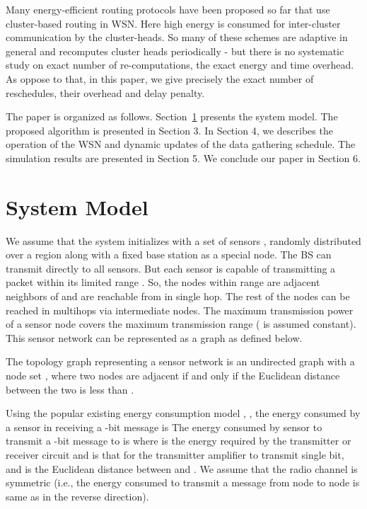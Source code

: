 \documentclass[10pt]{llncs}
\begin{document}
Many energy-efficient routing protocols have been proposed so far that use cluster-based routing \cite{Dimokas10} \cite{Dahnil12} \cite{Aslam11} \cite{Chamam09} in WSN. Here high energy is consumed for inter-cluster communication by the cluster-heads. So many of these schemes are adaptive in general and recomputes cluster heads periodically - but there is no systematic study on exact number of re-computations, the exact energy and time overhead. As oppose to that, in this paper, we give precisely the exact number of reschedules, their overhead and delay penalty.

The paper is organized as follows. Section~\ref{sec:SystemModel} presents the system model. The proposed algorithm is presented in Section 3. In Section 4, we describes the operation of the WSN and dynamic updates of the data gathering schedule. The simulation results are presented in Section 5. We conclude our paper in Section 6.

\section{System Model}\label{sec:SystemModel}

We assume that the system initializes with a set of  sensors , randomly distributed over a region along with a fixed base station  as a special node. The BS can transmit directly to all sensors. But each sensor  is capable of transmitting a packet within its limited range . So, the nodes within range  are adjacent neighbors of  and are reachable from  in single hop. The rest of the nodes can be reached in multihops via intermediate nodes. The maximum transmission power  of a sensor node covers the maximum transmission range  ( is assumed constant). This sensor network can be represented as a graph as defined below.

\begin{definition}
The topology graph  representing a sensor network is an undirected graph with a node set , where  two nodes are adjacent if and only if the Euclidean distance between the two is less than .
\end{definition}

Using the popular existing energy consumption model \cite{Heinzelman00}, \cite{Lindsey01}, the energy consumed by a sensor  in receiving a -bit message is  The energy consumed by sensor  to transmit a -bit message to  is  where  is the energy required by the transmitter or receiver circuit and  is that for the transmitter amplifier to transmit single bit, and  is the Euclidean distance between  and . We assume that the radio channel is symmetric (i.e., the energy consumed to transmit a message from node  to node  is same as in the reverse direction). 
\end{document}
